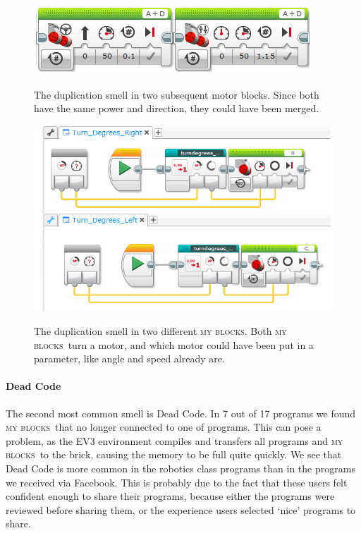 \documentclass{sig-alternate}
\newcommand{\mbs}{\textsc{my blocks}}
\begin{document}
\begin{figure} [ht]
\caption{The duplication smell in two subsequent motor blocks. Since both have the same power and direction, they could have been merged. }
\centering
\includegraphics[width=\columnwidth]{img/dup_ev3}
\label{fig:dup_ev3}
\end{figure}

\begin{figure} [ht]
\caption{The duplication smell in two different \mbs. Both \mbs~turn a motor, and which motor could have been put in a parameter, like angle and speed already are. }
\centering
\includegraphics[width=\columnwidth]{img/dup_ev3_myblocks}
\label{fig:dup_ev3_myblocks}
\end{figure}

\paragraph{Dead Code}
The second most common smell is Dead Code. In 7 out of 17 programs we found \mbs~that no longer connected to one of programs. This can pose a problem, as the EV3 environment compiles and transfers all programs and \mbs~to the brick, causing the memory to be full quite quickly. We see that Dead Code is more common in the robotics class programs than in the programs we received via Facebook. This is probably due to the fact that these users felt confident enough to share their programs, because either the programs were reviewed before sharing them, or the experience users selected `nice' programs to share.
\end{document}
